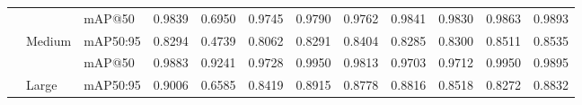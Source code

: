 \documentclass[12pt,oneside,bibtotoc,liststotoc]{scrbook}
\begin{document}
\begin{table}[H]
\begin{adjustbox}{max width=\textwidth}
\begin{tabular}{|l l l r r r r r r r r r|}
            \cmidrule{2-12}
            \rowcolor{rowdark}    &                         & mAP@50   & 0.9839 & 0.6950 & 0.9745 & 0.9790 & 0.9762 & 0.9841 & 0.9830 & 0.9863 & 0.9893 \\
            \rowcolor{rowdark}    & \multirow{-2}{*}{Medium} & mAP50:95 & 0.8294 & 0.4739 & 0.8062 & 0.8291 & 0.8404 & 0.8285 & 0.8300 & 0.8511 & 0.8535 \\
            \cmidrule{2-12}
            \rowcolor{rowdark}    &                         & mAP@50   & 0.9883 & 0.9241 & 0.9728 & 0.9950 & 0.9813 & 0.9703 & 0.9712 & 0.9950 & 0.9895 \\
            \rowcolor{rowdark} \multirow{-6}{*}{Combined} & \multirow{-2}{*}{Large} & mAP50:95 & 0.9006 & 0.6585 & 0.8419 & 0.8915 & 0.8778 & 0.8816 & 0.8518 & 0.8272 & 0.8832 \\
            \bottomrule
        \end{tabular}
    \end{adjustbox}
\end{table}
\end{document}
